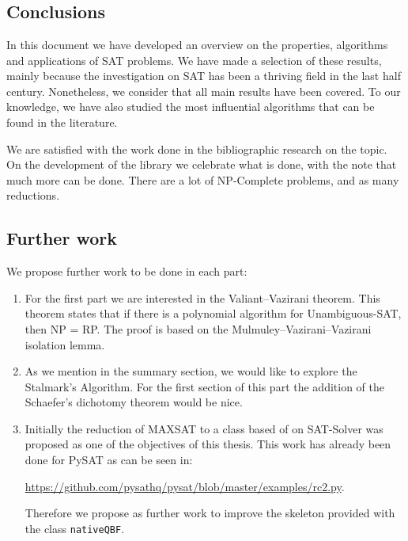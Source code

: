 

\chapter*{}
\section*{Conclusions} 


In this document we have developed an overview on the properties, algorithms and applications of SAT problems. We have made a selection of these results, mainly because the investigation on SAT has been a thriving field in the last half century. Nonetheless, we consider that all main results have been covered.  To our knowledge, we have also studied the most influential algorithms that can be found in the literature.

We are satisfied with the work done in the bibliographic research on the topic. On the development of the library we celebrate what is done, with the note that much more can be done. There are a lot of NP-Complete problems, and as many reductions.


\section*{Further work}

We propose further work to be done in each part:
\begin{enumerate}
\item For the first part we are interested in the Valiant–Vazirani theorem. This theorem states that if there is a polynomial algorithm for Unambiguous-SAT, then NP = RP. The proof is based on the Mulmuley–Vazirani–Vazirani isolation lemma.
\item As we mention in the summary section, we would like to explore the Stalmark's Algorithm. For the first section of this part the addition of the Schaefer's dichotomy theorem would be nice. 
\item Initially the reduction of MAXSAT to a class based of on SAT-Solver was proposed as one of the objectives of this thesis. This work has already been done for PySAT as can be seen in:
  \begin{center}
    \url{https://github.com/pysathq/pysat/blob/master/examples/rc2.py}.
  \end{center}

  Therefore we propose as further work to improve the skeleton provided with the class \texttt{nativeQBF}.   
\end{enumerate}